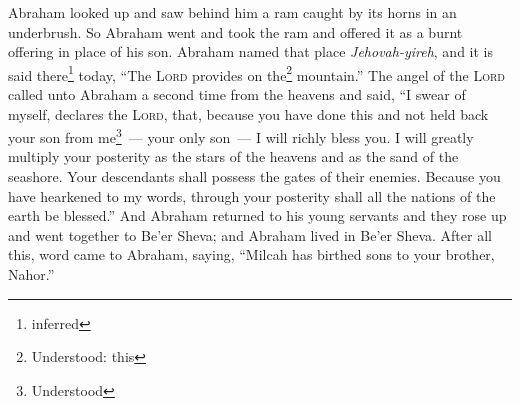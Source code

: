 \begin{enumerate}[align=center]
     Abraham looked up and saw behind him a ram caught by its horns in an underbrush. So Abraham went and took the ram and offered it as a burnt offering in place of his son.%
     Abraham named that place \textit{Jehovah-yireh}, and it is said there\footnote{inferred} today, ``The \textsc{Lord} provides on the\footnote{Understood: this} mountain.''%
     The angel of the \textsc{Lord} called unto Abraham a second time from the heavens%
     and said, ``I swear of myself, declares the \textsc{Lord}, that, because you have done this and not held back your son from me\footnote{Understood}~--- your only son~---%
     I will richly bless you. I will greatly multiply your posterity as the stars of the heavens and as the sand of the seashore. Your descendants shall possess the gates of their enemies.%
     Because you have hearkened to my words, through your posterity shall all the nations of the earth be blessed.''%
     And Abraham returned to his young servants and they rose up and went together to Be'er Sheva; and Abraham lived in Be'er Sheva.%
     After all this, word came to Abraham, saying, ``Milcah has birthed sons to your brother, Nahor.''%
\end{enumerate}
